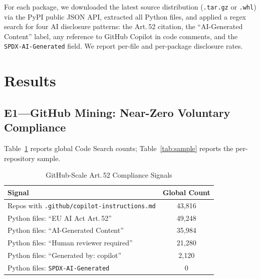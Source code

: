 \documentclass[conference]{IEEEtran}
\begin{document}
For each package, we downloaded the latest source distribution
(\texttt{.tar.gz} or \texttt{.whl}) via the PyPI public JSON API,
extracted all Python files, and applied a regex search for four AI
disclosure patterns: the Art.\,52 citation, the ``AI-Generated Content''
label, any reference to GitHub Copilot in code comments, and the
\texttt{SPDX-AI-Generated} field.  We report per-file and per-package
disclosure rates.

\section{Results}
\label{sec:results}

\subsection{E1---GitHub Mining: Near-Zero Voluntary Compliance}

Table~\ref{tab:global} reports global Code Search counts;
Table~\ref{tab:sample} reports the per-repository sample.

\begin{table}[htbp]
\caption{GitHub-Scale Art.\,52 Compliance Signals}
\label{tab:global}
\begin{center}
\begin{tabular}{lc}
\toprule
Signal & Global Count \\
\midrule
Repos with \texttt{.github/copilot-instructions.md} & 43,816 \\
Python files: ``EU AI Act Art.\,52''               & 49,248 \\
Python files: ``AI-Generated Content''             & 35,984 \\
Python files: ``Human reviewer required''          & 21,280 \\
Python files: ``Generated by: copilot''            &  2,120 \\
Python files: \texttt{SPDX-AI-Generated}           &      0 \\
\bottomrule
\end{tabular}
\end{center}
\end{table}
\end{document}
